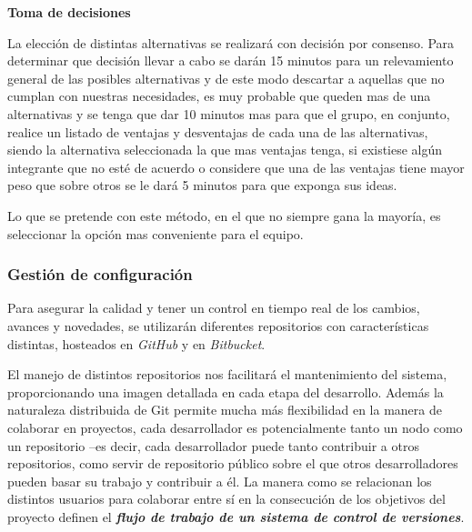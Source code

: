 \textbf{Toma de decisiones}

La elección de distintas alternativas se realizará con decisión por consenso.
Para determinar que decisión llevar a cabo se darán 15 minutos para un relevamiento general de las posibles alternativas y de este modo descartar a aquellas que no cumplan con nuestras necesidades, es muy probable que queden mas de una alternativas y se tenga que dar 10 minutos mas para que el grupo, en conjunto, realice un listado de ventajas y desventajas de cada una de las alternativas, siendo la alternativa seleccionada la que mas ventajas tenga, si existiese  algún integrante que no esté de acuerdo o considere que una de las ventajas tiene mayor peso que sobre otros se le dará 5 minutos para que exponga sus ideas.

Lo que se pretende con este método, en el que no siempre gana la mayoría, es seleccionar la opción mas conveniente para el equipo.





\subsubsection{Gestión de configuración}

Para asegurar la calidad y tener un control en tiempo real de los cambios, avances y novedades, se utilizarán diferentes repositorios con características distintas, hosteados en \textit{GitHub} y en \textit{Bitbucket}.

El manejo de distintos repositorios nos facilitará el mantenimiento del sistema, proporcionando una imagen detallada en cada etapa del desarrollo. 
Además la naturaleza distribuida de Git permite mucha más flexibilidad en la manera de colaborar en proyectos, cada desarrollador es potencialmente tanto un nodo como un repositorio --es decir, cada desarrollador puede tanto contribuir a otros repositorios, como servir de repositorio público sobre el que otros desarrolladores pueden basar su trabajo y contribuir a él. La manera como se relacionan los distintos usuarios para colaborar entre sí en la consecución de los objetivos del proyecto definen el \textit{\textbf{flujo de trabajo de un sistema de control de versiones}}.
  
